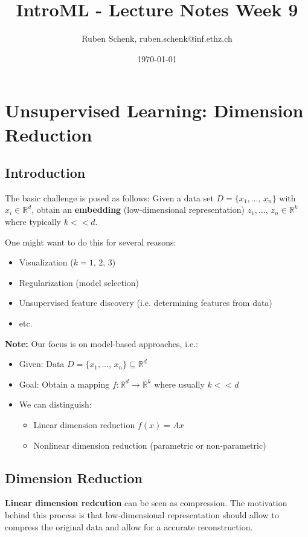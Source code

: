 \documentclass[a4paper]{extarticle}
\title{IntroML - Lecture Notes Week 9}
\author{Ruben Schenk, ruben.schenk@inf.ethz.ch}
\date{\today}
\begin{document}
\maketitle

\section{Unsupervised Learning: Dimension Reduction}

\subsection{Introduction}

The basic challenge is posed as follows: Given a data set $D = \{x_1,..., \, x_n\}$ with $x_i \in \mathbb{R}^d$, obtain an \textbf{embedding} (low-dimensional representation) $z_1,..., \, z_n \in \mathbb{R}^k$ where typically $k << d$.

One might want to do this for several reasons:
\begin{itemize}
    \item Visualization ($k = 1, \, 2, \, 3$)
    \item Regularization (model selection)
    \item Unsupervised feature discovery (i.e. determining features from data)
    \item etc.
\end{itemize}

\textbf{Note:} Our focus is on model-based approaches, i.e.:
\begin{itemize}
    \item Given: Data $D = \{x_1,..., \, x_n\} \subseteq \mathbb{R}^d$
    \item Goal: Obtain a mapping $f : \mathbb{R}^d \to \mathbb{R}^k$ where usually $k << d$
    \item We can distinguish:
    \begin{itemize}
        \item Linear dimension reduction $f(x) = Ax$
        \item Nonlinear dimension reduction (parametric or non-parametric)
    \end{itemize}
\end{itemize}

\subsection{Dimension Reduction}

\textbf{Linear dimension redcution} can be seen as compression. The motivation behind this process is that low-dimensional representation should allow to compress the original data and allow for a accurate reconstruction.
\end{document}
